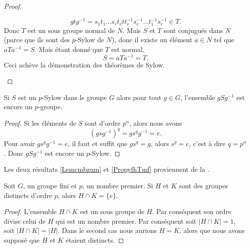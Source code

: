 \begin{proof}
\begin{enumerate}
            \begin{equation}
                gtg^{-1}=s_1t_1\ldots s_rt_rtt_r^{-1}s_r^{-1}\ldots t_1^{-1}s_r^{-1}\in T.
            \end{equation}
            Donc \( T\) est un sous groupe normal de \( N\). Mais \( S\) et \( T\) sont conjugués dans \( N\) (parce que ils sont des $p$-Sylow de \( N\)), donc il existe un élément \( a\in N\) tel que \( aTa^{-1}=S\). Mais étant donné que \( T\) est normal,
            \begin{equation}
                S=aTa^{-1}=T.
            \end{equation}
            Ceci achève la démonstration des théorèmes de Sylow.

    \end{enumerate}
\end{proof}

\begin{proposition}
    Si \( S\) est un \( p\)-Sylow dans le groupe \( G\) alors pour tout \( g\in G\), l'ensemble \( gSg^{-1}\) est encore un \( p\)-groupe.    
\end{proposition}

\begin{proof}
    Si les éléments de \( S\) sont d'ordre \( p^n\), alors nous avons
    \begin{equation}
        (gsg^{-1})^q=gs^qg^{-1}=e.
    \end{equation}
    Pour avoir \( gs^qg^{-1}=e\), il faut et suffit que \( gs^q=g\), alors \( s^q=e\), c'est à dire \( q=p^n\). Donc \( gSg^{-1}\) est encore un \( p\)-Sylow.
\end{proof}

Les deux résultats \ref{Lemcmbzum} et \ref{PropyfhTmf} proviennent de la .

\begin{lemma}\label{Lemcmbzum}
    Soit \( G\), un groupe fini et \( p\), un nombre premier. Si \( H\) et \( K\) sont des groupes distincts d'ordre \( p\), alors \( H\cap K=\{ e \}\).
\end{lemma}

\begin{proof}
    L'ensemble \( H\cap K\) est un sous groupe de \( H\). Par conséquent son ordre divise celui de \( H\) qui est un nombre premier. Par conséquent soit \( | H\cap K |=1\), soit \( | H\cap K |=| H |\). Dans le second cas nous aurions \( H=K\), alors que nous avons supposé que \( H\) et \( K\) étaient distincts.
\end{proof}


